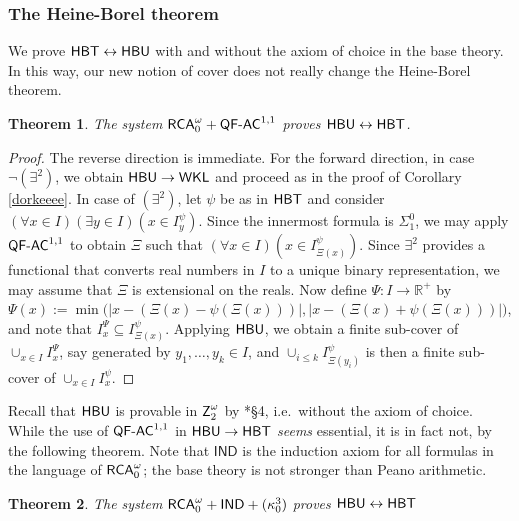 \documentclass[reqno]{amsart}
\newtheorem{thm}{Theorem}
\def\Z{\textup{\textsf{Z}}}
\def\RCA{\textup{\textsf{RCA}}}
\def\RCAo{\textup{\textsf{RCA}}_{0}^{\omega}}
\def\WKL{\textup{\textsf{WKL}}}
\def\R{{\mathbb  R}}
\def\di{\rightarrow}
\def\asa{\leftrightarrow}
\def\QFAC{\textup{\textsf{QF-AC}}}
\def\HBU{\textup{\textsf{HBU}}}
\def\HBT{\textup{\textsf{HBT}}}
\numberwithin{equation}{section}
\numberwithin{thm}{section}
\begin{document}
\subsubsection{The Heine-Borel theorem}
We prove $\HBT\asa \HBU$ with and without the axiom of choice in the base theory. 
In this way, our new notion of cover does not really change the Heine-Borel theorem.
\begin{thm}\label{ziedenauw}
The system $\RCA_{0}^{\omega}+\QFAC^{1,1}$ proves $\HBU\asa \HBT$.
\end{thm}
\begin{proof}
The reverse direction is immediate.  For the forward direction, in case $\neg(\exists^{2})$, we obtain $\HBU\di \WKL$ and proceed as in the proof of Corollary \ref{dorkeeee}. 
In case of $(\exists^{2})$, let $\psi$ be as in $\HBT$ and consider $(\forall x\in I)(\exists y\in I)(x\in I_{y}^{\psi})$.  Since the innermost formula is $\Sigma_{1}^{0}$, we may 
apply $\QFAC^{1,1}$ to obtain $\Xi$ such that $(\forall x\in I)(x\in I_{\Xi(x)}^{\psi})$.  Since $\exists^{2}$ provides a functional that converts real numbers in $I$ to a unique binary representation, we may assume that $\Xi$ is extensional on the reals.   
Now define $\Psi:I\di \R^{+}$ by $\Psi(x):=\min\big(|x-(\Xi(x)-\psi(\Xi(x)))|, |x-(\Xi(x)+\psi(\Xi(x)))|\big)$, and note that $I^{\Psi}_{x}\subseteq I_{\Xi(x)}^{\psi}$.  
Applying $\HBU$, we obtain a finite sub-cover of $\cup_{x\in I}I_{x}^{\Psi}$, say generated by $y_{1}, \dots, y_{k}\in I $, and $\cup_{i\leq k}I_{\Xi(y_{i})}^{\psi}$ is then a finite sub-cover of $\cup_{x\in I}I_{x}^{\psi}$.
\end{proof}
Recall that $\HBU$ is provable in $\Z_{2}^{\omega}$ by \cite{dagsamV}*{\S4}, i.e.\ without the axiom of choice.  
While the use of $\QFAC^{1,1}$ in $\HBU\di \HBT$ \emph{seems} essential, it is in fact not, by the following theorem.  
Note that $\textsf{IND}$ is the induction axiom for all formulas in the language of $\RCAo$; the base theory is not stronger than Peano arithmetic. 
\begin{thm}\label{fugu}
The system $\RCAo+\textsf{\textup{IND}}+(\kappa_{0}^{3})$ proves $\HBU\asa \HBT$
\end{thm}
\end{document}
